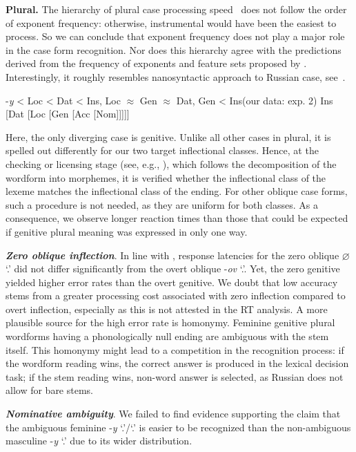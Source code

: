 \documentclass[output=paper, modfonts,newtxmath,hidelinks]{langscibook}
\begin{document}
\textbf{Plural.} The hierarchy of plural case processing speed~ does not follow the order of exponent frequency: otherwise, instrumental would have been the easiest to process. So we can conclude that exponent frequency does not play a major role in the case form recognition. Nor does this hierarchy agree with the predictions derived from the frequency of exponents and feature sets proposed by \citet{muller2004decomposing, wiese2004categories, wunderlich2004there}. Interestingly, it roughly resembles  nanosyntactic approach to Russian case, see~.

\ea \ea	\label{ex:plHierarchy} -\textit{y} < Loc < Dat < Ins, Loc $\approx$ Gen $\approx$ Dat, Gen < Ins\hfill (our data: exp. 2)
    \ex \label{ex:cahafunc} \ob Ins [Dat [Loc [Gen [Acc [Nom]]]]]\cb
    \z 
\z

\noindent Here, the only diverging case is genitive. Unlike all other cases in plural, it is spelled out differently for our two target inflectional classes. Hence, at the checking or licensing stage (see, e.g., \citealt{bertram2000role}), which follows the decomposition of the wordform into morphemes,  it is verified whether the inflectional class of the lexeme matches the inflectional class of the ending. For other oblique case forms, such a procedure is not needed, as they are uniform for both classes. As a consequence, we observe longer reaction times than those that could be expected if genitive plural meaning was expressed in only one way.

\textbf{\textit{Zero oblique inflection}}. In line with \citet{gor2017processing}, response latencies for the zero oblique \textit{$\varnothing$} `\genn.\pl' did not differ significantly from the overt oblique -\textit{ov} `\genn.\pl'. Yet, the zero genitive yielded higher error rates than the overt genitive. We doubt that low accuracy stems from a greater processing cost associated with zero inflection compared to overt inflection, especially as this is not attested in the RT analysis. A more plausible source for the high error rate is homonymy. Feminine genitive plural wordforms having a phonologically null ending are ambiguous with the stem itself. This homonymy might lead to a competition in the recognition process: if the wordform reading wins, the correct answer is produced in the lexical decision task; if the stem reading wins, non-word answer is selected, as Russian does not allow for bare stems.

\textbf{\textit{Nominative ambiguity}}. We failed to find evidence supporting the claim that the ambiguous feminine -\textit{y} `\nomm.\pl'\slash `\genn.\sg' is easier to be recognized than the non-ambiguous masculine -\textit{y} `\nomm.\pl' due to its wider distribution.\\
\end{document}
